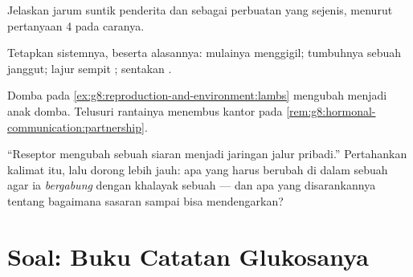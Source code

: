 \begin{exercise}[$\star\star$]\label{exo:g8:hormonal-communication:9}
Jelaskan jarum suntik penderita  dan  sebagai perbuatan yang sejenis, menurut
pertanyaan 4 pada caranya.
\end{exercise}

\begin{exercise}[$\star\star$]\label{exo:g8:hormonal-communication:10}
Tetapkan sistemnya, beserta alasannya: mulainya menggigil;
tumbuhnya sebuah janggut; lajur sempit  ;
sentakan .
\end{exercise}

\begin{exercise}[$\star\star$]\label{exo:g8:hormonal-communication:11}
Domba pada \cref{ex:g8:reproduction-and-environment:lambs}
mengubah  menjadi anak domba. Telusuri rantainya
menembus kantor pada
\cref{rem:g8:hormonal-communication:partnership}.
\end{exercise}

\begin{exercise}[$\star\star\star$]\label{exo:g8:hormonal-communication:12}
``Reseptor mengubah sebuah siaran menjadi jaringan jalur
pribadi.'' Pertahankan kalimat itu, lalu dorong lebih jauh:
apa yang harus berubah di dalam sebuah  agar ia
\emph{bergabung} dengan khalayak sebuah  --- dan apa
yang disarankannya tentang bagaimana sasaran 
sampai bisa mendengarkan?
\end{exercise}

\section{Soal: Buku Catatan Glukosanya}


